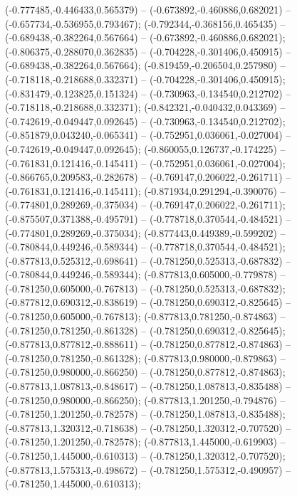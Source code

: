  (-0.777485,-0.446433,0.565379) -- (-0.673892,-0.460886,0.682021) -- (-0.657734,-0.536955,0.793467);
 (-0.792344,-0.368156,0.465435) -- (-0.689438,-0.382264,0.567664) -- (-0.673892,-0.460886,0.682021);
 (-0.806375,-0.288070,0.362835) -- (-0.704228,-0.301406,0.450915) -- (-0.689438,-0.382264,0.567664);
 (-0.819459,-0.206504,0.257980) -- (-0.718118,-0.218688,0.332371) -- (-0.704228,-0.301406,0.450915);
 (-0.831479,-0.123825,0.151324) -- (-0.730963,-0.134540,0.212702) -- (-0.718118,-0.218688,0.332371);
 (-0.842321,-0.040432,0.043369) -- (-0.742619,-0.049447,0.092645) -- (-0.730963,-0.134540,0.212702);
 (-0.851879,0.043240,-0.065341) -- (-0.752951,0.036061,-0.027004) -- (-0.742619,-0.049447,0.092645);
 (-0.860055,0.126737,-0.174225) -- (-0.761831,0.121416,-0.145411) -- (-0.752951,0.036061,-0.027004);
 (-0.866765,0.209583,-0.282678) -- (-0.769147,0.206022,-0.261711) -- (-0.761831,0.121416,-0.145411);
 (-0.871934,0.291294,-0.390076) -- (-0.774801,0.289269,-0.375034) -- (-0.769147,0.206022,-0.261711);
 (-0.875507,0.371388,-0.495791) -- (-0.778718,0.370544,-0.484521) -- (-0.774801,0.289269,-0.375034);
 (-0.877443,0.449389,-0.599202) -- (-0.780844,0.449246,-0.589344) -- (-0.778718,0.370544,-0.484521);
 (-0.877813,0.525312,-0.698641) -- (-0.781250,0.525313,-0.687832) -- (-0.780844,0.449246,-0.589344);
 (-0.877813,0.605000,-0.779878) -- (-0.781250,0.605000,-0.767813) -- (-0.781250,0.525313,-0.687832);
 (-0.877812,0.690312,-0.838619) -- (-0.781250,0.690312,-0.825645) -- (-0.781250,0.605000,-0.767813);
 (-0.877813,0.781250,-0.874863) -- (-0.781250,0.781250,-0.861328) -- (-0.781250,0.690312,-0.825645);
 (-0.877813,0.877812,-0.888611) -- (-0.781250,0.877812,-0.874863) -- (-0.781250,0.781250,-0.861328);
 (-0.877813,0.980000,-0.879863) -- (-0.781250,0.980000,-0.866250) -- (-0.781250,0.877812,-0.874863);
 (-0.877813,1.087813,-0.848617) -- (-0.781250,1.087813,-0.835488) -- (-0.781250,0.980000,-0.866250);
 (-0.877813,1.201250,-0.794876) -- (-0.781250,1.201250,-0.782578) -- (-0.781250,1.087813,-0.835488);
 (-0.877813,1.320312,-0.718638) -- (-0.781250,1.320312,-0.707520) -- (-0.781250,1.201250,-0.782578);
 (-0.877813,1.445000,-0.619903) -- (-0.781250,1.445000,-0.610313) -- (-0.781250,1.320312,-0.707520);
 (-0.877813,1.575313,-0.498672) -- (-0.781250,1.575312,-0.490957) -- (-0.781250,1.445000,-0.610313);
